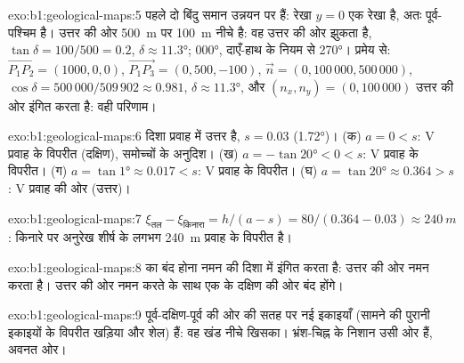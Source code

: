 \begin{solution}{exo:b1:geological-maps:5}
पहले दो बिंदु समान उन्नयन पर हैं: रेखा $y = 0$ एक  रेखा है, अतः  पूर्व-पश्चिम है।  उत्तर की
ओर \qty{500}{m} पर \qty{100}{m} नीचे है: वह उत्तर की ओर झुकता है, $\tan\delta = 100/500 = 0.2$,
$\delta \approx \ang{11.3}$;  \ang{000}, दाएँ-हाथ के नियम से  \ang{270}। प्रमेय से:
$\overrightarrow{P_1P_2} = (1000, 0, 0)$,
$\overrightarrow{P_1P_3} = (0, 500, -100)$, $\vec n = (0, 100\,000,
500\,000)$, $\cos\delta = 500\,000/509\,902 \approx 0.981$, $\delta \approx
\ang{11.3}$, और $(n_x, n_y) = (0, 100\,000)$ उत्तर की ओर इंगित करता है: वही परिणाम।
\end{solution}

\begin{solution}{exo:b1:geological-maps:6}
दिशा प्रवाह में उत्तर है, $s = 0.03$ (\ang{1.72})। (क) $a = 0 < s$: V प्रवाह के विपरीत (दक्षिण), समोच्चों के
अनुदिश। (ख) $a = -\tan\ang{20} < 0 < s$: V प्रवाह के विपरीत। (ग) $a = \tan\ang{1} \approx 0.017 < s$: V प्रवाह
के विपरीत। (घ) $a = \tan\ang{20}
\approx 0.364 > s$: V प्रवाह की ओर (उत्तर)।
\end{solution}

\begin{solution}{exo:b1:geological-maps:7}
$\xi_{\text{तल}} - \xi_{\text{किनारा}} = h/(a - s) = 80/(0.364 - 0.03)
\approx \qty{240}{m}$: किनारे पर अनुरेख शीर्ष के लगभग \qty{240}{m} प्रवाह के विपरीत है।
\end{solution}

\begin{solution}{exo:b1:geological-maps:8}
 का बंद होना नमन की दिशा में इंगित करता है:  उत्तर की ओर नमन करता है। उत्तर की ओर नमन
करते  के साथ एक  के  दक्षिण की ओर बंद होंगे।
\end{solution}

\begin{solution}{exo:b1:geological-maps:9}
पूर्व-दक्षिण-पूर्व की ओर की सतह पर नई इकाइयाँ (सामने की पुरानी इकाइयों के विपरीत खड़िया और शेल) हैं: वह
खंड नीचे खिसका। भ्रंश-चिह्न के निशान उसी ओर हैं, अवनत ओर।
\end{solution}

